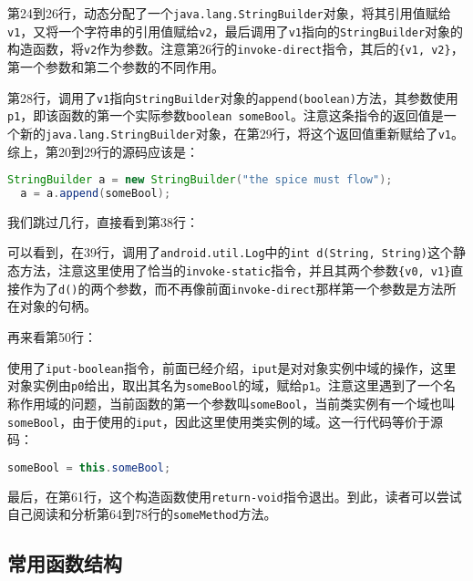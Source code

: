 第24到26行，动态分配了一个\lstinline!java.lang.StringBuilder!对象，将其引用值赋给\lstinline!v1!，又将一个字符串的引用值赋给\lstinline!v2!，最后调用了\lstinline!v1!指向的\lstinline!StringBuilder!对象的构造函数，将\lstinline!v2!作为参数。注意第26行的\lstinline!invoke-direct!指令，其后的\lstinline!{v1, v2}!，第一个参数和第二个参数的不同作用。


第28行，调用了\lstinline!v1!指向\lstinline!StringBuilder!对象的\lstinline!append(boolean)!方法，其参数使用\lstinline!p1!，即该函数的第一个实际参数\lstinline!boolean someBool!。注意这条指令的返回值是一个新的\lstinline!java.lang.StringBuilder!对象，在第29行，将这个返回值重新赋给了\lstinline!v1!。综上，第20到29行的源码应该是：

\begin{lstlisting}[language=java, numbers=none]
  StringBuilder a = new StringBuilder("the spice must flow");
  a = a.append(someBool);
\end{lstlisting}

我们跳过几行，直接看到第38行：


可以看到，在39行，调用了\lstinline!android.util.Log!中的\lstinline!int d(String, String)!这个静态方法，注意这里使用了恰当的\lstinline!invoke-static!指令，并且其两个参数\lstinline!{v0, v1}!直接作为了\lstinline!d()!的两个参数，而不再像前面\lstinline!invoke-direct!那样第一个参数是方法所在对象的句柄。

再来看第50行：

使用了\lstinline!iput-boolean!指令，前面已经介绍，\lstinline!iput!是对对象实例中域的操作，这里对象实例由\lstinline!p0!给出，取出其名为\lstinline!someBool!的域，赋给\lstinline!p1!。注意这里遇到了一个名称作用域的问题，当前函数的第一个参数叫\lstinline!someBool!，当前类实例有一个域也叫\lstinline!someBool!，由于使用的\lstinline!iput!，因此这里使用类实例的域。这一行代码等价于源码：
\begin{lstlisting}[language=java, numbers=none]
  someBool = this.someBool;
\end{lstlisting}

最后，在第61行，这个构造函数使用\lstinline!return-void!指令退出。到此，读者可以尝试自己阅读和分析第64到78行的\lstinline!someMethod!方法。

\subsection{常用函数结构}
